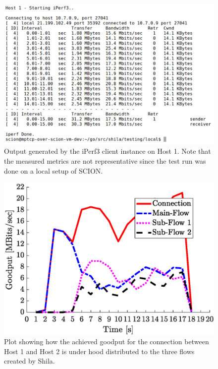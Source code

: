\begin{figure}
	\begin{center}
		\includegraphics[scale=0.27]{../illustrations/shilaIntroduction/OutputiPerf3Host1.pdf}  
		\caption[]{Output generated by the iPerf3 client instance on Host 1. Note that the measured metrics are not representative since the test run was done on a local setup of SCION.}
		\label{fig:IntroductionOutputIperfOnHost1}
	\end{center}
\end{figure}

\begin{figure}
	\begin{center}
		\includegraphics[scale=0.65]{../illustrations/shilaIntroduction/DistributionOfFlows.eps}  
		\caption[]{Plot showing how the achieved goodput for the connection between Host 1 and Host 2 is under hood distributed to the three flows created by Shila.}
		\label{fig:IntroductionDataDistributionAmongPaths}
	\end{center}
\end{figure}


